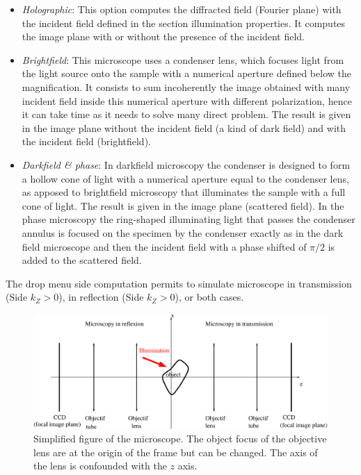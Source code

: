 \begin{itemize}

\item {\it Holographic}: This option computes the diffracted field
  (Fourier plane) with the incident field defined in the section
  illumination properties. It computes the image plane with or without
  the presence of the incident field.


  
\item {\it Brightfield}: This microscope uses a condenser lens, which
  focuses light from the light source onto the sample with a numerical
  aperture defined below the magnification. It consists to sum
  incoherently the image obtained with many incident field inside this
  numerical aperture with different polarization, hence it can take
  time as it needs to solve many direct problem. The result is given
  in the image plane without the incident field (a kind of dark field)
  and with the incident field (brightfield).

\item {\it Darkfield \& phase}: In darkfield microscopy the condenser
  is designed to form a hollow cone of light with a numerical aperture
  equal to the condenser lens, as apposed to brightfield microscopy
  that illuminates the sample with a full cone of light. The result is
  given in the image plane (scattered field). In the phase microscopy
  the ring-shaped illuminating light that passes the condenser annulus
  is focused on the specimen by the condenser exactly as in the dark
  field microscope and then the incident field with a phase shifted of
  $\pi/2$ is added to the scattered field.
  
\end{itemize}

The drop menu side computation permits to simulate microscope in
transmission (Side $k_Z>0$), in reflection (Side $k_Z>0$), or both
cases. 


\begin{figure}[h]
\begin{center}
\includegraphics*[draft=false,width=150mm]{microscopie.eps}
\caption{Simplified figure of the microscope. The object focus of the
  objective lens are at the origin of the frame but can be changed. The
  axis of the lens is confounded with the $z$ axis.}
\label{lentille}
\end{center}
\end{figure}


